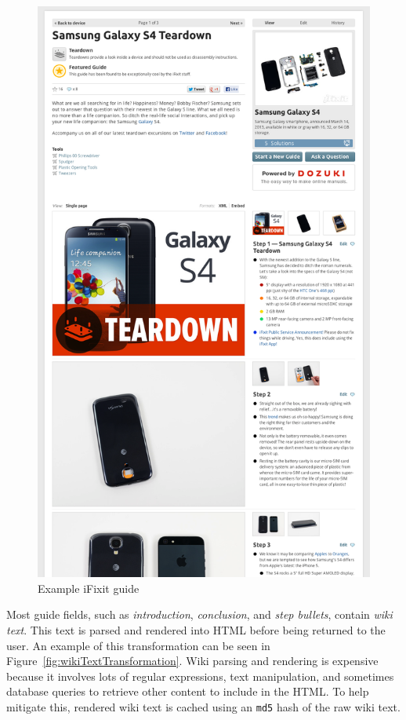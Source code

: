 \documentclass[12pt]{ucthesis}
\begin{document}
\begin{figure}[hbtp]
\centering
\includegraphics[width=\textwidth,height=0.95\textheight]{assets/iFixitGuideExample.png}
\caption{Example iFixit guide}
\label{fig:iFixitGuideExample}
\end{figure}

Most guide fields, such as \textit{introduction}, \textit{conclusion}, and \textit{step bullets}, contain \textit{wiki text}.
This text is parsed and rendered into HTML before being returned to the user.
An example of this transformation can be seen in Figure~\ref{fig:wikiTextTransformation}.
Wiki parsing and rendering is expensive because it involves lots of regular expressions, text manipulation, and sometimes database queries to retrieve other content to include in the HTML.
To help mitigate this, rendered wiki text is cached using an {\tt md5} hash of the raw wiki text.
\end{document}
